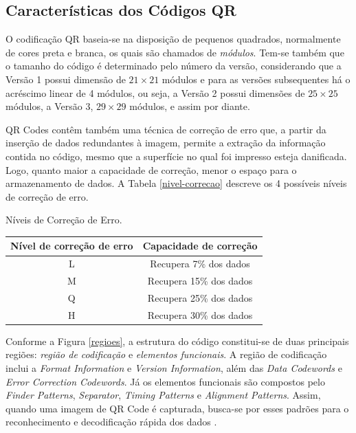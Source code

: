 \documentclass{ceel}
\begin{document}
\begin{multicols}{2}
\section{Características dos Códigos QR} \label{caracteristicas}
O codificação QR baseia-se na disposição de pequenos quadrados, normalmente de cores preta e branca, os quais são chamados de \textit{módulos}. Tem-se também que o tamanho do código é determinado pelo número da versão, considerando que a Versão 1 possui dimensão de $21\times21$ módulos e para as versões subsequentes há o acréscimo linear de 4 módulos, ou seja, a Versão 2 possui dimensões de $25\times25$ módulos, a Versão 3, $29\times29$ módulos, e assim por diante. 

QR Codes contêm também uma técnica de correção de erro que, a partir da inserção de dados redundantes à imagem, permite a extração da informação contida no código, mesmo que a superfície no qual foi impresso esteja danificada. Logo, quanto maior a capacidade de correção, menor o espaço para o armazenamento de dados. A Tabela \ref{nivel-correcao} descreve os 4 possíveis níveis de correção de erro.

\vspace{0.15cm}
\begin{minipage}[h]{\columnwidth}
\begin{scriptsize}
    \def\arraystretch{1.35}
    \captionsetup{type=table}
    \begin{center}
    \caption{Níveis de Correção de Erro.} \label{nivel-correcao}
    \vspace{-0.2cm}
    \begin{tabular}{ c  c } \toprule
    \textbf{Nível de correção de erro}&  \textbf{Capacidade de correção}\\\midrule
     L & Recupera 7\% dos dados \\
    M & Recupera 15\% dos dados \\
    Q & Recupera 25\% dos dados \\
    H & Recupera 30\% dos dados \\\bottomrule
    \end{tabular}
    \end{center}
\end{scriptsize}
\end{minipage}
\vspace{0.12cm}

Conforme a Figura \ref{regioes}, a estrutura do código constitui-se de duas principais regiões: \textit{região de codificação} e \textit{elementos funcionais}. A região de codificação inclui a \textit{Format Information} e \textit{Version Information}, além das \textit{Data Codewords} e \textit{Error Correction Codewords}. Já os elementos funcionais são compostos pelo \textit{Finder Patterns}, \textit{Separator}, \textit{Timing Patterns} e \textit{Alignment Patterns}. Assim, quando uma imagem de QR Code é capturada, busca-se por esses padrões para o reconhecimento e decodificação rápida dos dados \cite{qr-tutorial}.


\end{multicols}
\end{document}
